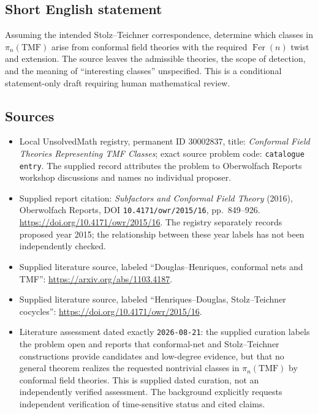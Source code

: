 \documentclass[11pt]{article}
\begin{document}
\subsection{Short English statement}
Assuming the intended Stolz--Teichner correspondence, determine which classes in \(\pi_n(\mathrm{TMF})\) arise from conformal field theories with the required \(\operatorname{Fer}(n)\) twist and extension. The source leaves the admissible theories, the scope of detection, and the meaning of ``interesting classes'' unspecified. This is a conditional statement-only draft requiring human mathematical review.
\subsection{Sources}
\begin{itemize}
\item Local UnsolvedMath registry, permanent ID \(30002837\), title: \emph{Conformal Field Theories Representing TMF Classes}; exact source problem code: \texttt{catalogue entry}. The supplied record attributes the problem to Oberwolfach Reports workshop discussions and names no individual proposer.
\item Supplied report citation: \emph{Subfactors and Conformal Field Theory} (2016), Oberwolfach Reports, DOI \texttt{10.4171/owr/2015/16}, pp.\ 849--926. \url{https://doi.org/10.4171/owr/2015/16}. The registry separately records proposed year 2015; the relationship between these year labels has not been independently checked.
\item Supplied literature source, labeled ``Douglas--Henriques, conformal nets and TMF'': \url{https://arxiv.org/abs/1103.4187}.
\item Supplied literature source, labeled ``Henriques--Douglas, Stolz--Teichner cocycles'': \url{https://doi.org/10.4171/owr/2015/16}.
\item Literature assessment dated exactly \texttt{2026-08-21}: the supplied curation labels the problem open and reports that conformal-net and Stolz--Teichner constructions provide candidates and low-degree evidence, but that no general theorem realizes the requested nontrivial classes in \(\pi_n(\mathrm{TMF})\) by conformal field theories. This is supplied dated curation, not an independently verified assessment. The background explicitly requests independent verification of time-sensitive status and cited claims.
\end{itemize}
\end{document}
